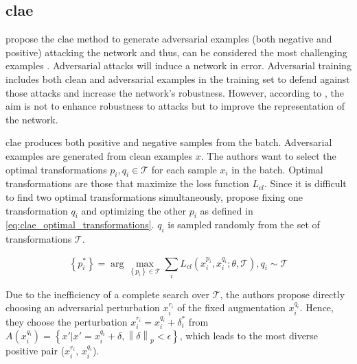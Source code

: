 \subsection{\acl{clae}}\label{subsec:adversarial_examples}


\citeauthor{adversarial_2020} propose the \ac{clae} method to generate adversarial examples 
(both negative and positive) attacking the network and thus,
can be considered the most challenging examples \cite{adversarial_2020}.
Adversarial attacks will induce a network in error.
Adversarial training includes both clean and adversarial examples in the training set to defend against those attacks and 
increase the network's robustness.
However, according to \citeauthor{adversarial_2020}, the aim is not to enhance robustness to attacks 
but to improve the representation of the network.

\ac{clae} produces both positive and negative samples from the batch.
Adversarial examples are generated from clean examples $x$.
The authors want to select the optimal transformations $p_i, q_i \in \mathcal{T}$ for each sample $x_i$ in the batch.
Optimal transformations are those that maximize the loss function $L_{cl}$.
Since it is difficult to find two optimal transformations simultaneously, 
\citeauthor{adversarial_2020} propose fixing one transformation $q_i$ and 
optimizing the other $p_i$ as defined in \eqref{eq:clae_optimal_transformations}.
$q_i$ is sampled randomly from the set of transformations $\mathcal{T}$.

\begin{equation}
    \left\{p^*_i\right\} = \arg\max_{\left\{p_i\right\} \in \mathcal{T}} \sum_{i}^{}L_{cl}(x_i^{p_i}, x_i^{q_i}; \theta, \mathcal{T}), q_i \sim \mathcal{T}
    \label{eq:clae_optimal_transformations}
\end{equation}

Due to the inefficiency of a complete search over $\mathcal{T}$, 
the authors propose directly choosing an adversarial perturbation $x^{r_i}_i$ of the fixed augmentation $x_i^{q_i}$.
Hence, they choose the perturbation $x^{r_i}_i = x^{q_i}_i + \delta^*_i$ from 
$A(x^{q_i}_i) = \left\{x' | x' = x^{q_i}_i + \delta, \left\|\delta\right\|_p < \epsilon\right\}$,
which leads to the most diverse positive pair ($x^{r_i}_i$, $x^{q_i}_i$).

